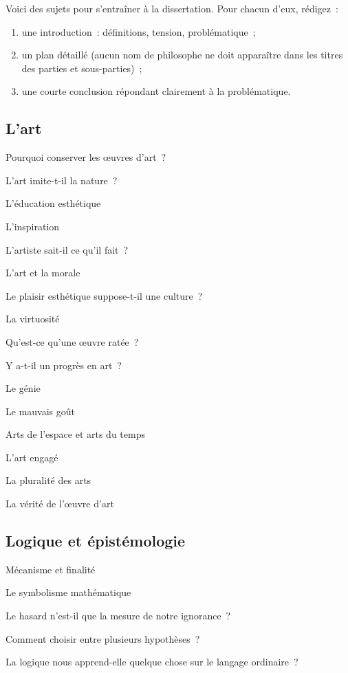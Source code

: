\documentclass[a4paper,12pt]{article}
\begin{document}
Voici des sujets pour s'entraîner à la dissertation. Pour chacun d'eux,
rédigez :

\begin{enumerate}
\item une introduction : définitions, tension, problématique ;

\item un plan détaillé (aucun nom de philosophe ne doit apparaître dans les
titres des parties et sous-parties) ;

\item une courte conclusion répondant clairement à la problématique.
\end{enumerate}

\subsection{L'art}
\label{sec-6-1}

Pourquoi conserver les œuvres d'art ?

L'art imite-t-il la nature ?

L'éducation esthétique

L'inspiration

L'artiste sait-il ce qu'il fait ?

L'art et la morale

Le plaisir esthétique suppose-t-il une culture ?

La virtuosité

Qu'est-ce qu'une œuvre ratée ?

Y a-t-il un progrès en art ?

Le génie

Le mauvais goût

Arts de l'espace et arts du temps

L'art engagé

La pluralité des arts

La vérité de l'œuvre d'art

\subsection{Logique et épistémologie}
\label{sec-6-2}

Mécanisme et finalité

Le symbolisme mathématique

Le hasard n'est-il que la mesure de notre ignorance ?

Comment choisir entre plusieurs hypothèses ?

La logique nous apprend-elle quelque chose sur le langage ordinaire ?
\end{document}
